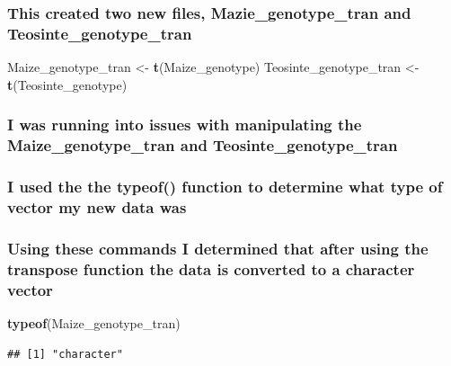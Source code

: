 \documentclass[
]{article}
\newenvironment{Shaded}{\begin{snugshade}}{\end{snugshade}}
\newcommand{\FunctionTok}[1]{\textcolor[rgb]{0.13,0.29,0.53}{\textbf{#1}}}
\newcommand{\NormalTok}[1]{#1}
\newcommand{\OtherTok}[1]{\textcolor[rgb]{0.56,0.35,0.01}{#1}}
\begin{document}
\subsubsection{This created two new files, Mazie\_genotype\_tran and
Teosinte\_genotype\_tran}\label{this-created-two-new-files-mazie_genotype_tran-and-teosinte_genotype_tran}

\begin{Shaded}
\begin{Highlighting}[]
\NormalTok{Maize\_genotype\_tran }\OtherTok{\textless{}{-}} \FunctionTok{t}\NormalTok{(Maize\_genotype)}
\NormalTok{Teosinte\_genotype\_tran }\OtherTok{\textless{}{-}} \FunctionTok{t}\NormalTok{(Teosinte\_genotype)}
\end{Highlighting}
\end{Shaded}

\subsubsection{I was running into issues with manipulating the
Maize\_genotype\_tran and
Teosinte\_genotype\_tran}\label{i-was-running-into-issues-with-manipulating-the-maize_genotype_tran-and-teosinte_genotype_tran}

\subsubsection{I used the the typeof() function to determine what type
of vector my new data
was}\label{i-used-the-the-typeof-function-to-determine-what-type-of-vector-my-new-data-was}

\subsubsection{Using these commands I determined that after using the
transpose function the data is converted to a character
vector}\label{using-these-commands-i-determined-that-after-using-the-transpose-function-the-data-is-converted-to-a-character-vector}

\begin{Shaded}
\begin{Highlighting}[]
\FunctionTok{typeof}\NormalTok{(Maize\_genotype\_tran)}
\end{Highlighting}
\end{Shaded}

\begin{verbatim}
## [1] "character"
\end{verbatim}
\end{document}
